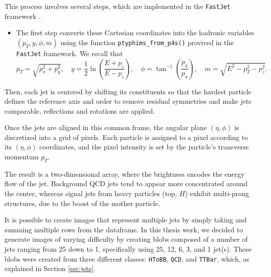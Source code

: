 This process involves several steps, which are implemented in the \texttt{FastJet} framework \cite{Cacciari_2012}.
\begin{itemize}
    \item The first step converts these Cartesian coordinates into the hadronic variables $(p_T, y, \phi, m)$ using the function \texttt{ptyphims\_from\_p4s()} provived in the \texttt{FastJet} framework. We recall that 
             \begin{equation}
                    p_T = \sqrt{p_x^2 + p_y^2}, \quad y = \frac{1}{2} \ln\left(\frac{E + p_z}{E - p_z}\right), \quad \phi = \tan^{-1}\left(\frac{p_y}{p_x}\right), \quad m = \sqrt{E^2 - p_T^2 - p_z^2}.
             \end{equation}
 \end{itemize}

Then, each jet is centered by shifting its constituents so that the hardest particle defines the reference axis and order to remove residual symmetries and make jets comparable, reflections and rotations are applied.

Once the jets are aligned in this common frame, the angular plane $(\eta, \phi)$ is discretized into a grid of pixels. 
Each particle is assigned to a pixel according to its $(\eta, \phi)$ coordinates, 
and the pixel intensity is set by the particle’s transverse momentum $p_T$.  

The result is a two-dimensional array, where the brightness encodes the energy flow of the jet. 
Background QCD jets tend to appear more concentrated around the center, whereas signal jets from heavy particles (top, $H$) 
exhibit multi-prong structures, due to the boost of the mother particle.

It is possible to create images that represent multiple jets by simply taking and summing multiple rows from the dataframe. In this thesis work, we decided to generate images of varying difficulty by creating blobs composed of a number of jets ranging from 25 down to 1, specifically using 25, 12, 6, 3, and 1 jet(s). These blobs were created from three different classes: \texttt{HToBB}, \texttt{QCD}, and \texttt{TTBar}, which, as explained in Section \ref{sec:jets}.

